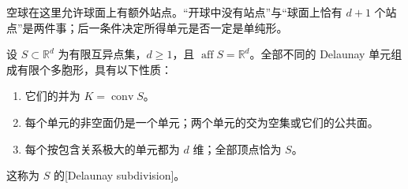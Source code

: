 空球在这里允许球面上有额外站点。“开球中没有站点”与“球面上恰有 \(d+1\) 个站点”是两件事；后一条件决定所得单元是否一定是单纯形。

\begin{theorem}\label{g1:thm:delaunay-subdivision}
	设 \(S\subset\mathbb R^d\) 为有限互异点集，\(d\ge1\)，且 \(\operatorname{aff}S=\mathbb R^d\)。全部不同的 Delaunay 单元组成有限个多胞形，具有以下性质：
	\begin{enumerate}
		\item 它们的并为 \(K=\operatorname{conv}S\)。
		\item 每个单元的非空面仍是一个单元；两个单元的交为空集或它们的公共面。
		\item 每个按包含关系极大的单元都为 \(d\) 维；全部顶点恰为 \(S\)。
	\end{enumerate}
	这称为 \(S\) 的[Delaunay subdivision]。
\end{theorem}
